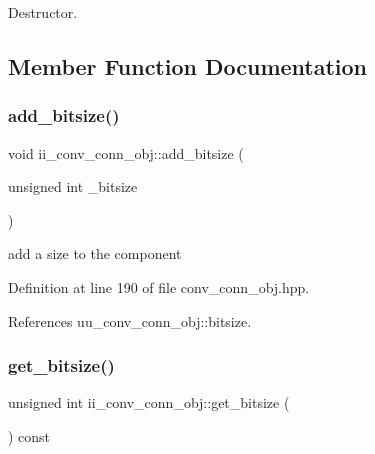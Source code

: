 Destructor. 



\subsection{Member Function Documentation}
\mbox{\label{classii__conv__conn__obj_ac0871f08256e3e77c02f78c2b0eafd32}} 
\subsubsection{\texorpdfstring{add\+\_\+bitsize()}{add\_bitsize()}}
{\footnotesize\ttfamily void ii\+\_\+conv\+\_\+conn\+\_\+obj\+::add\+\_\+bitsize (\begin{DoxyParamCaption}\item[{unsigned int}]{\+\_\+bitsize }\end{DoxyParamCaption})\hspace{0.3cm}{\ttfamily [inline]}}



add a size to the component 



Definition at line 190 of file conv\+\_\+conn\+\_\+obj.\+hpp.



References uu\+\_\+conv\+\_\+conn\+\_\+obj\+::bitsize.

\mbox{\label{classii__conv__conn__obj_a5fe391a450049808b437da46c463b3e2}} 
\subsubsection{\texorpdfstring{get\+\_\+bitsize()}{get\_bitsize()}}
{\footnotesize\ttfamily unsigned int ii\+\_\+conv\+\_\+conn\+\_\+obj\+::get\+\_\+bitsize (\begin{DoxyParamCaption}{ }\end{DoxyParamCaption}) const\hspace{0.3cm}{\ttfamily [inline]}}




